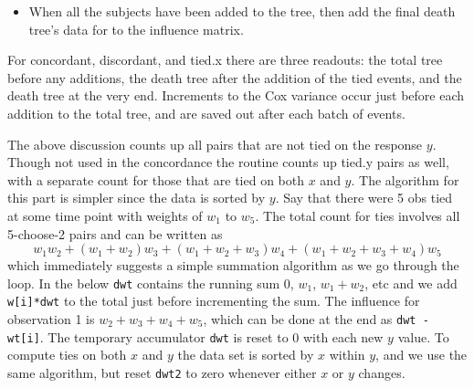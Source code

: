 \documentclass{article}
\newcommand{\code}[1]{\texttt{#1}}
\begin{document}
\begin{itemize}
    \item When all the subjects have been added to the tree, then add the final
      death tree's data for to the influence matrix.  
\end{itemize}

For concordant, discordant, and tied.x there are three
readouts: the total tree before any additions, the death tree after the 
addition of the tied events, and the death tree at the very end.
Increments to the Cox variance occur just before each addition to the total 
tree, and are saved out after each batch of events.

The above discussion counts up all pairs that are not tied on the response $y$.
Though not used in the concordance the routine counts up tied.y pairs as well,
with a separate count for those that are tied on both $x$ and $y$.
The algorithm for this part is simpler since the data is sorted by $y$.
Say that there were 5 obs tied at some time point with weights of $w_1$ to
$w_5$.  
The total count for ties involves all 5-choose-2 pairs and can be written as
$$
 w_1 w_2 + (w_1 + w_2)w_3 + (w_1 + w_2 + w_3)w_4 + (w_1 + w_2 + w_3 + w_4)w_5
$$
which immediately suggests a simple summation algorithm as we go through the
loop.  In the below \code{dwt} contains the running sum 0, $w_1$, $w_1 + w_2$,
etc and we add \code{w[i]*dwt} to the total just before incrementing the sum.
The influence for observation 1 is $w_2 + w_3 + w_4 + w_5$, which can be done
at the end as \code{dwt - wt[i]}.
The temporary accumulator \code{dwt} is reset to 0 with each new $y$
value.
To compute ties on both $x$ and $y$ the data set is sorted by $x$ within $y$,
and we use the same algorithm, but reset \code{dwt2} to zero  whenever 
either $x$ or $y$ changes.
\end{document}
